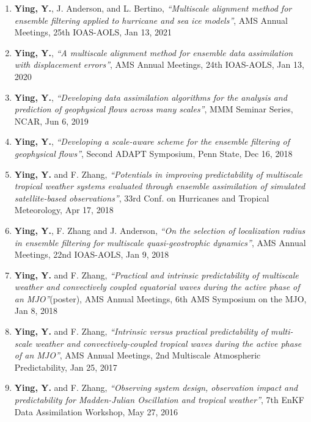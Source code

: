 \begin{enumerate}
\item \textbf{Ying, Y.}, J. Anderson, and L. Bertino,
\textit{``Multiscale alignment method for ensemble filtering applied to hurricane and sea ice models''},
AMS Annual Meetings, 25th IOAS-AOLS, Jan 13, 2021

\item \textbf{Ying, Y.},
\textit{``A multiscale alignment method for ensemble data assimilation with displacement errors''},
AMS Annual Meetings, 24th IOAS-AOLS, Jan 13, 2020

\item \textbf{Ying, Y.},
\textit{``Developing data assimilation algorithms for the analysis and prediction of geophysical flows across many scales''},
MMM Seminar Series, NCAR, Jun 6, 2019

\item \textbf{Ying, Y.},
\textit{``Developing a scale-aware scheme for the ensemble filtering of geophysical flows''},
Second ADAPT Symposium, Penn State, Dec 16, 2018

\item \textbf{Ying, Y.} and F. Zhang,
\textit{``Potentials in improving predictability of multiscale tropical weather systems evaluated through ensemble assimilation of simulated satellite-based observations''},
33rd Conf. on Hurricanes and Tropical Meteorology, Apr 17, 2018

\item \textbf{Ying, Y.}, F. Zhang and J. Anderson,
\textit{``On the selection of localization radius in ensemble filtering for multiscale quasi-geostrophic dynamics''},
AMS Annual Meetings, 22nd IOAS-AOLS, Jan 9, 2018

\item \textbf{Ying, Y.} and F. Zhang,
\textit{``Practical and intrinsic predictability of multiscale weather and convectively coupled equatorial waves during the active phase of an MJO''}(poster),
AMS Annual Meetings, 6th AMS Symposium on the MJO, Jan 8, 2018

\item \textbf{Ying, Y.} and F. Zhang,
\textit{``Intrinsic versus practical predictability of multi-scale weather and convectively-coupled tropical waves during the active phase of an MJO''},
AMS Annual Meetings, 2nd Multiscale Atmospheric Predictability, Jan 25, 2017

\item \textbf{Ying, Y.} and F. Zhang,
\textit{``Observing system design, observation impact and predictability for Madden-Julian Oscillation and tropical weather''},
7th EnKF Data Assimilation Workshop, May 27, 2016


\end{enumerate}
